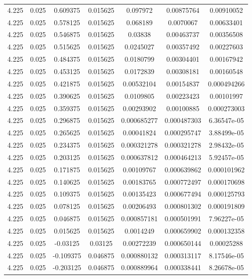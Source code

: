\begin{flushleft}
\begin{longtable}{ccccccc}
4.225 & 0.025 & 0.609375 & 0.015625 & 0.097972 & 0.00875764 & 0.00910052  \\ 
4.225 & 0.025 & 0.578125 & 0.015625 & 0.068189 & 0.0070067 & 0.00633401  \\ 
4.225 & 0.025 & 0.546875 & 0.015625 & 0.03838 & 0.00463737 & 0.00356508  \\ 
4.225 & 0.025 & 0.515625 & 0.015625 & 0.0245027 & 0.00357492 & 0.00227603  \\ 
4.225 & 0.025 & 0.484375 & 0.015625 & 0.0180799 & 0.00304401 & 0.00167942  \\ 
4.225 & 0.025 & 0.453125 & 0.015625 & 0.0172839 & 0.00308181 & 0.00160548  \\ 
4.225 & 0.025 & 0.421875 & 0.015625 & 0.00532104 & 0.00154837 & 0.000494266  \\ 
4.225 & 0.025 & 0.390625 & 0.015625 & 0.0109805 & 0.00223423 & 0.00101997  \\ 
4.225 & 0.025 & 0.359375 & 0.015625 & 0.00293902 & 0.00100885 & 0.000273003  \\ 
4.225 & 0.025 & 0.296875 & 0.015625 & 0.000685277 & 0.000487303 & 6.36547e-05  \\ 
4.225 & 0.025 & 0.265625 & 0.015625 & 0.00041824 & 0.000295747 & 3.88499e-05  \\ 
4.225 & 0.025 & 0.234375 & 0.015625 & 0.000321278 & 0.000321278 & 2.98432e-05  \\ 
4.225 & 0.025 & 0.203125 & 0.015625 & 0.000637812 & 0.000464213 & 5.92457e-05  \\ 
4.225 & 0.025 & 0.171875 & 0.015625 & 0.00109767 & 0.000639862 & 0.000101962  \\ 
4.225 & 0.025 & 0.140625 & 0.015625 & 0.00183765 & 0.000772497 & 0.000170698  \\ 
4.225 & 0.025 & 0.109375 & 0.015625 & 0.00135423 & 0.000677494 & 0.000125793  \\ 
4.225 & 0.025 & 0.078125 & 0.015625 & 0.00206493 & 0.000801302 & 0.000191809  \\ 
4.225 & 0.025 & 0.046875 & 0.015625 & 0.000857181 & 0.000501991 & 7.96227e-05  \\ 
4.225 & 0.025 & 0.015625 & 0.015625 & 0.0014249 & 0.000659902 & 0.000132358  \\ 
4.225 & 0.025 & -0.03125 & 0.03125 & 0.00272239 & 0.000650144 & 0.00025288  \\ 
4.225 & 0.025 & -0.109375 & 0.046875 & 0.000880132 & 0.000313117 & 8.17546e-05  \\ 
4.225 & 0.025 & -0.203125 & 0.046875 & 0.000889964 & 0.000338441 & 8.26678e-05  \\ 

\end{longtable}
\end{flushleft}
